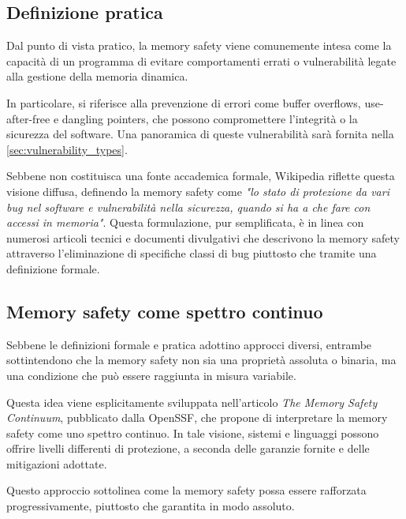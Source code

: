 \subsection{Definizione pratica}
\label{sec:practical_definition}

Dal punto di vista pratico, la memory safety viene comunemente intesa come la
capacità di un programma di evitare comportamenti errati o vulnerabilità legate
alla gestione della memoria dinamica.

In particolare, si riferisce alla prevenzione di errori come buffer overflows,
use-after-free e dangling pointers, che possono compromettere l'integrità o la sicurezza
del software. Una panoramica di queste vulnerabilità sarà fornita nella \autoref{sec:vulnerability_types}.

Sebbene non costituisca una fonte accademica formale, Wikipedia\cite{wikipedia_definition}
riflette questa visione diffusa, definendo la memory safety come \textit{"lo stato
di protezione da vari bug nel software e vulnerabilità nella sicurezza, quando
si ha a che fare con accessi in memoria"}. Questa formulazione, pur semplificata,
è in linea con numerosi articoli tecnici e documenti divulgativi che descrivono la
memory safety attraverso l'eliminazione di specifiche classi di bug piuttosto che
tramite una definizione formale.

\subsection{Memory safety come spettro continuo}
\label{sec:continuum_definition}

Sebbene le definizioni formale e pratica adottino approcci diversi, entrambe sottintendono
che la memory safety non sia una proprietà assoluta o binaria, ma una condizione
che può essere raggiunta in misura variabile.

Questa idea viene esplicitamente sviluppata nell'articolo \textit{The Memory
Safety Continuum}\cite{memory_safety_continuum}, pubblicato dalla OpenSSF, che
propone di interpretare la memory safety come uno spettro continuo. In tale visione,
sistemi e linguaggi possono offrire livelli differenti di protezione, a seconda delle
garanzie fornite e delle mitigazioni adottate.

Questo approccio sottolinea come la memory safety possa essere rafforzata progressivamente,
piuttosto che garantita in modo assoluto.